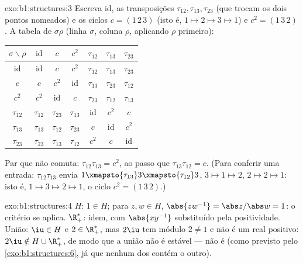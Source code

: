 \begin{solution}{exo:b1:structures:3}
Escreva $\mathrm{id}$, as transposições $\tau_{12}, \tau_{13},
\tau_{23}$ (que trocam os dois pontos nomeados) e os ciclos $c =
(1\,2\,3)$ (isto é, $1 \mapsto 2 \mapsto 3 \mapsto 1$) e $c^2 =
(1\,3\,2)$. A tabela de $\sigma\rho$ (linha $\sigma$, coluna $\rho$,
aplicando $\rho$ primeiro):
\begin{center}
\renewcommand{\arraystretch}{1.2}
\begin{tabular}{c|cccccc}
$\sigma\backslash\rho$ & $\mathrm{id}$ & $c$ & $c^2$ & $\tau_{12}$ &
$\tau_{13}$ & $\tau_{23}$ \\
\hline
$\mathrm{id}$ & $\mathrm{id}$ & $c$ & $c^2$ & $\tau_{12}$ &
$\tau_{13}$ & $\tau_{23}$ \\
$c$ & $c$ & $c^2$ & $\mathrm{id}$ & $\tau_{13}$ & $\tau_{23}$ &
$\tau_{12}$ \\
$c^2$ & $c^2$ & $\mathrm{id}$ & $c$ & $\tau_{23}$ & $\tau_{12}$ &
$\tau_{13}$ \\
$\tau_{12}$ & $\tau_{12}$ & $\tau_{23}$ & $\tau_{13}$ & $\mathrm{id}$
& $c^2$ & $c$ \\
$\tau_{13}$ & $\tau_{13}$ & $\tau_{12}$ & $\tau_{23}$ & $c$ &
$\mathrm{id}$ & $c^2$ \\
$\tau_{23}$ & $\tau_{23}$ & $\tau_{13}$ & $\tau_{12}$ & $c^2$ & $c$ &
$\mathrm{id}$ \\
\end{tabular}
\end{center}
Par que não comuta: $\tau_{12}\tau_{13} = c^2$, ao passo que
$\tau_{13}\tau_{12} = c$. (Para conferir uma entrada:
$\tau_{12}\tau_{13}$ envia $1 \xmapsto{\tau_{13}} 3
\xmapsto{\tau_{12}} 3$, $3 \mapsto 1 \mapsto 2$, $2 \mapsto 2 \mapsto
1$: isto é, $1 \mapsto 3 \mapsto 2 \mapsto 1$, o ciclo $c^2 =
(1\,3\,2)$.)
\end{solution}

\begin{solution}{exo:b1:structures:4}
$H$: $1 \in H$; para $z, w \in H$, $\abs{zw^{-1}} = \abs z / \abs w =
1$: o critério se aplica. $\R_+^*$: idem, com $\abs{xy^{-1}}$ substituído
pela positividade. União: $\iu \in H$ e $2 \in \R_+^*$, mas $2\iu$ tem
módulo $2 \neq 1$ e não é um real positivo: $2\iu \notin H \cup
\R_+^*$, de modo que a união não é estável --- não é  (como
previsto pelo \cref{exo:b1:structures:6}, já que nenhum dos  contém o outro).
\end{solution}

